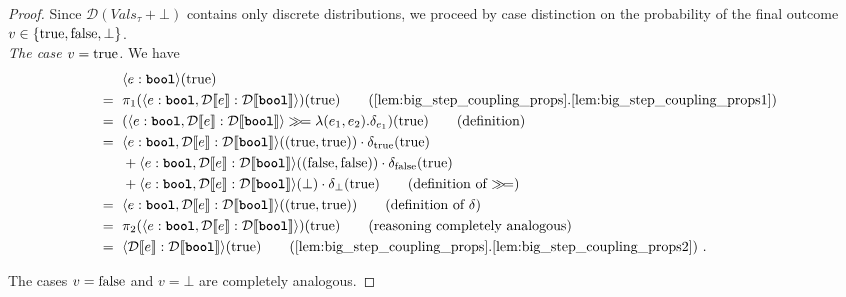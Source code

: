 \begin{proof}
	Since $\mathcal{D}(Vals_\tau + \bot)$ contains only discrete distributions, we proceed by case distinction on the probability of the final outcome $v\in\{\textnormal{true},\textnormal{false},\bot\}$.\\
	
	\emph{The case $v=\textnormal{true}$.} We have 
	\begin{align*}
		&  \bigsem{e : \bool}(\true) \\
		{}={}~& \pi_1 (\bigsem{e : \bool, \discretize{e}:\discretize{\bool}})(\true)
		\tag{\Cref{lem:big_step_coupling_props}.\ref{lem:big_step_coupling_props1}} \\
		{}={}~& (\bigsem{e : \bool, \discretize{e}:\discretize{\bool}} \gg\!= \lambda(e_1,e_2). \delta_{e_1})(\true)
		\tag{definition} \\
		{}={}~& \bigsem{e : \bool, \discretize{e}:\discretize{\bool}}((\true,\true))\cdot \delta_{\true}(\true) \\
		&{}+ 
		\bigsem{e : \bool, \discretize{e}:\discretize{\bool}}((\false,\false))\cdot \delta_{\false}(\true) \\
		&{}+ 
		\bigsem{e : \bool, \discretize{e}:\discretize{\bool}}(\bot)\cdot \delta_{\bot}(\true) 
		\tag{definition of $\gg\!=$} \\
		{}={}~& \bigsem{e : \bool, \discretize{e}:\discretize{\bool}}((\true,\true))
		\tag{definition of $\delta$} \\
		{}={}~& \pi_2(\bigsem{e : \bool, \discretize{e}:\discretize{\bool}})(\true)
		\tag{reasoning completely analogous} \\
		{}={}~& \bigsem{\discretize{e}:\discretize{\bool}}(\true)
		\tag{\Cref{lem:big_step_coupling_props}.\ref{lem:big_step_coupling_props2}} ~.
	\end{align*}
	
	The cases $v=\textnormal{false}$ and $v=\bot$ are completely analogous.
	

\end{proof}
